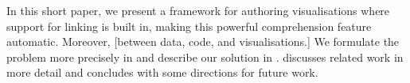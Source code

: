 In this short paper, we present a framework for authoring visualisations where
support for linking is built in, making this powerful comprehension feature
automatic. Moreover, [between data, code, and visualisations.] We formulate the
problem more precisely in  and describe our solution in
.  discusses related work in more detail
and  concludes with some directions for future work.
